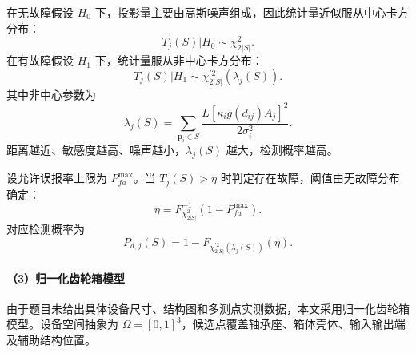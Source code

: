 \documentclass[UTF8,a4paper,12pt]{ctexart}
\numberwithin{figure}{section}
\numberwithin{table}{section}
\begin{document}
在无故障假设 \(H_0\) 下，投影量主要由高斯噪声组成，因此统计量近似服从中心卡方分布：
\[
T_j(S)|H_0\sim\chi^2_{2|S|}.
\]
在有故障假设 \(H_1\) 下，统计量服从非中心卡方分布：
\[
T_j(S)|H_1\sim\chi^{\prime 2}_{2|S|}(\lambda_j(S)).
\]
其中非中心参数为
\[
\lambda_j(S)=
\sum_{\boldsymbol p_i\in S}
\frac{L[\kappa_i g(d_{ij})A_j]^2}{2\sigma_i^2}.
\]
距离越近、敏感度越高、噪声越小，\(\lambda_j(S)\) 越大，检测概率越高。

设允许误报率上限为 \(P_{fa}^{\max}\)。当 \(T_j(S)>\eta\) 时判定存在故障，阈值由无故障分布确定：
\[
\eta=F_{\chi^2_{2|S|}}^{-1}(1-P_{fa}^{\max}).
\]
对应检测概率为
\[
P_{d,j}(S)=1-F_{\chi^{\prime 2}_{2|S|}(\lambda_j(S))}(\eta).
\]

\paragraph{（3）归一化齿轮箱模型}

由于题目未给出具体设备尺寸、结构图和多测点实测数据，本文采用归一化齿轮箱模型。设备空间抽象为 \(\Omega=[0,1]^3\)，候选点覆盖轴承座、箱体壳体、输入输出端及辅助结构位置。
\end{document}
